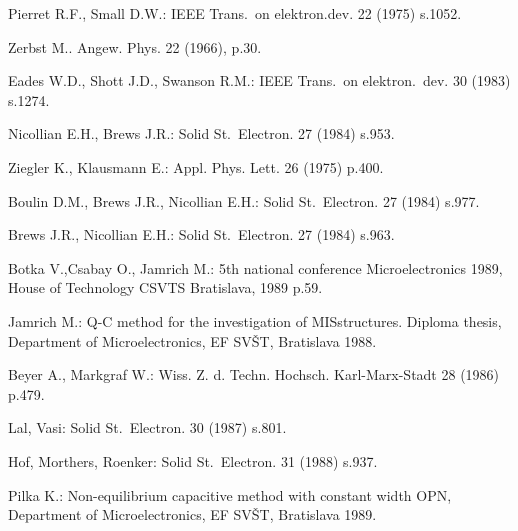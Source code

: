 \begin{thebibliography}{}

  Pierret R.F., Small D.W.: IEEE Trans.\ on elektron.dev. 22 (1975) s.1052.

  Zerbst M.. Angew. Phys. 22 (1966), p.30.

  Eades W.D., Shott J.D., Swanson R.M.: IEEE Trans.\ on elektron.\ dev. 30 (1983) s.1274.

  Nicollian E.H., Brews J.R.: Solid St.\ Electron.  27 (1984) s.953.

  Ziegler K., Klausmann E.: Appl. Phys. Lett. 26 (1975) p.400.

  Boulin D.M., Brews J.R., Nicollian E.H.: Solid St.\ Electron. 27 (1984) s.977.

  Brews J.R., Nicollian E.H.: Solid St.\ Electron. 27 (1984) s.963.

  Botka V.,Csabay O., Jamrich M.: 5th national conference Microelectronics 1989, House of Technology CSVTS Bratislava, 1989 p.59.

  Jamrich M.: Q-C method for the investigation of MIS\@ structures. Diploma thesis, Department of Microelectronics, EF SVŠT, Bratislava 1988.

  Beyer A., Markgraf W.: Wiss. Z. d. Techn. Hochsch. Karl-Marx-Stadt 28 (1986) p.479.

  Lal, Vasi: Solid St.\ Electron. 30 (1987) s.801.

  Hof, Morthers, Roenker: Solid St.\ Electron. 31 (1988) s.937.

  Pilka K.: Non-equilibrium capacitive method with constant width OPN, Department of Microelectronics, EF SVŠT, Bratislava 1989.

\end{thebibliography}
